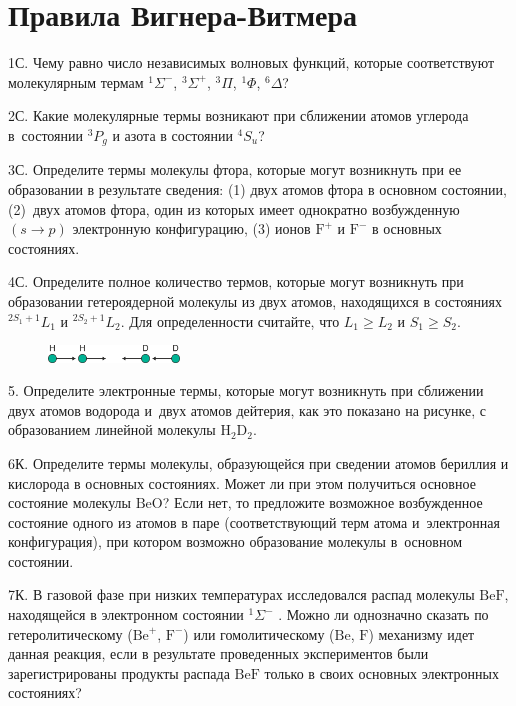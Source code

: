 \setmainfont{Noto Serif}
\setsansfont{Noto Sans}
\setmonofont{Noto Sans Mono}


\section{Правила Вигнера-Витмера}
1С. Чему равно число независимых волновых функций, которые соответствуют молекулярным термам $^1\Sigma^-$, $^3\Sigma^+$, $^3\Pi$, $^1\Phi$, $^6\Delta$?
\par
2С. Какие молекулярные термы возникают при сближении атомов углерода в~состоянии $^3P_g$ и азота в состоянии $^4S_u$?
\par
3С. Определите термы молекулы фтора, которые могут возникнуть при ее образовании в результате сведения: (1) двух атомов фтора в основном состоянии, (2)~двух атомов фтора, один из которых имеет однократно возбужденную $(s \rightarrow p)$ электронную конфигурацию, (3) ионов $\text{F}^+$ и $\text{F}^-$ в основных состояниях.
\par
4С. Определите полное количество термов, которые могут возникнуть при образовании гетероядерной молекулы из двух атомов, находящихся в состояниях $^{2S_1 + 1}L_1$ и $^{2S_2 + 1}L_2$. Для определенности считайте, что $L_1 \geq L_2$ и $S_1 \geq S_2$.
\par
\begin{figure} %
    \centering
    \vspace{0mm}
    \includegraphics[width=35mm]{images/Fig_1_5_5.png}
    \vspace{-5mm}
\end{figure}
5. Определите электронные термы, которые могут возникнуть при сближении двух атомов водорода и~двух атомов дейтерия, как это показано на рисунке, с образованием линейной молекулы $\text{H}_2 \text{D}_2$.
\par
6К. Определите термы молекулы, образующейся при сведении атомов бериллия и кислорода в основных состояниях. Может ли при этом получиться основное состояние молекулы $\text{BeO}$? Если нет, то предложите возможное возбужденное состояние одного из атомов в паре (соответствующий терм атома и~электронная конфигурация), при котором возможно образование молекулы в~основном состоянии.
\par
7К. В газовой фазе при низких температурах исследовался распад молекулы $\text{BeF}$, находящейся в электронном состоянии $^1 \Sigma ^-$ . Можно ли однозначно сказать по гетеролитическому ($\text{Be}^+$, $\text{F}^-$) или гомолитическому ($\text{Be}$, $\text{F}$) механизму идет данная реакция, если в результате проведенных экспериментов были зарегистрированы продукты распада $\text{BeF}$ только в своих основных электронных состояниях?
